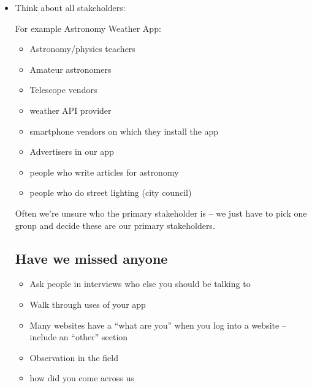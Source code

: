 \documentclass[10pt, a4paper]{article}
\begin{document}
\begin{itemize}

\item Think about all stakeholders:

For example Astronomy Weather App:

\begin{itemize}

\item Astronomy/physics teachers

\item Amateur astronomers

\item Telescope vendors

\item weather API provider

\item smartphone vendors on which they install the app

\item Advertisers in our app

\item people who write articles for astronomy

\item people who do street lighting (city council)

\end{itemize}

Often we're unsure who the primary stakeholder is -- we just have to pick one group and decide these are our primary
stakeholders.

\subsection{Have we missed anyone}

\begin{itemize}

\item Ask people in interviews who else you should be talking to

\item Walk through uses of your app

\item Many websites have a ``what are you'' when you log into a website -- include an ``other'' section

\item Observation in the field

\item how did you come across us


\end{itemize}
\end{itemize}
\end{document}
